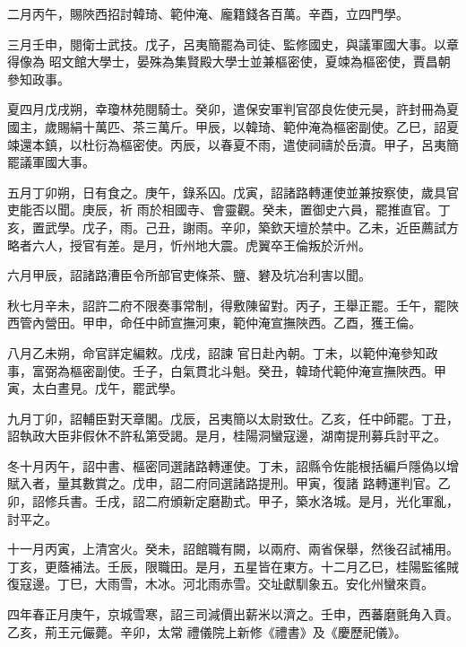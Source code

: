 \begin{pinyinscope}
 二月丙午，賜陜西招討韓琦、範仲淹、龐籍錢各百萬。辛酉，立四門學。



 三月壬申，閱衛士武技。戊子，呂夷簡罷為司徒、監修國史，與議軍國大事。以章得像為
 昭文館大學士，晏殊為集賢殿大學士並兼樞密使，夏竦為樞密使，賈昌朝參知政事。



 夏四月戊戌朔，幸瓊林苑閱騎士。癸卯，遣保安軍判官邵良佐使元昊，許封冊為夏國主，歲賜絹十萬匹、茶三萬斤。甲辰，以韓琦、範仲淹為樞密副使。乙巳，詔夏竦還本鎮，以杜衍為樞密使。丙辰，以春夏不雨，遣使祠禱於岳瀆。甲子，呂夷簡罷議軍國大事。



 五月丁卯朔，日有食之。庚午，錄系囚。戊寅，詔諸路轉運使並兼按察使，歲具官吏能否以聞。庚辰，祈
 雨於相國寺、會靈觀。癸未，置御史六員，罷推直官。丁亥，置武學。戊子，雨。己丑，謝雨。辛卯，築欽天壇於禁中。乙未，近臣薦試方略者六人，授官有差。是月，忻州地大震。虎翼卒王倫叛於沂州。



 六月甲辰，詔諸路漕臣令所部官吏條茶、鹽、礬及坑冶利害以聞。



 秋七月辛未，詔許二府不限奏事常制，得敷陳留對。丙子，王舉正罷。壬午，罷陜西管內營田。甲申，命任中師宣撫河東，範仲淹宣撫陜西。乙酉，獲王倫。



 八月乙未朔，命官詳定編敕。戊戌，詔諫
 官日赴內朝。丁未，以範仲淹參知政事，富弼為樞密副使。壬子，白氣貫北斗魁。癸丑，韓琦代範仲淹宣撫陜西。甲寅，太白晝見。戊午，罷武學。



 九月丁卯，詔輔臣對天章閣。戊辰，呂夷簡以太尉致仕。乙亥，任中師罷。丁丑，詔執政大臣非假休不許私第受謁。是月，桂陽洞蠻寇邊，湖南提刑募兵討平之。



 冬十月丙午，詔中書、樞密同選諸路轉運使。丁未，詔縣令佐能根括編戶隱偽以增賦入者，量其數賞之。戊申，詔二府同選諸路提刑。甲寅，復諸
 路轉運判官。乙卯，詔修兵書。壬戌，詔二府頒新定磨勘式。甲子，築水洛城。是月，光化軍亂，討平之。



 十一月丙寅，上清宮火。癸未，詔館職有闕，以兩府、兩省保舉，然後召試補用。丁亥，更蔭補法。壬辰，限職田。是月，五星皆在東方。十二月乙巳，桂陽監徭賊復寇邊。丁巳，大雨雪，木冰。河北雨赤雪。交址獻馴象五。安化州蠻來貢。



 四年春正月庚午，京城雪寒，詔三司減價出薪米以濟之。壬申，西蕃磨氈角入貢。乙亥，荊王元儼薨。辛卯，太常
 禮儀院上新修《禮書》及《慶歷祀儀》。




\end{pinyinscope}
